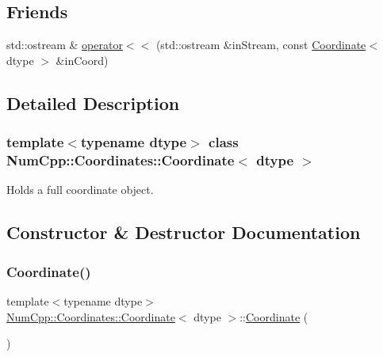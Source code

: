 \subsection*{Friends}
\begin{DoxyCompactItemize}
\item 
std\+::ostream \& \mbox{\hyperlink{class_num_cpp_1_1_coordinates_1_1_coordinate_aa5a56295ef46edb54bf7fdafb169c081}{operator$<$$<$}} (std\+::ostream \&in\+Stream, const \mbox{\hyperlink{class_num_cpp_1_1_coordinates_1_1_coordinate}{Coordinate}}$<$ dtype $>$ \&in\+Coord)
\end{DoxyCompactItemize}


\subsection{Detailed Description}
\subsubsection*{template$<$typename dtype$>$\newline
class Num\+Cpp\+::\+Coordinates\+::\+Coordinate$<$ dtype $>$}

Holds a full coordinate object. 

\subsection{Constructor \& Destructor Documentation}
\mbox{\label{class_num_cpp_1_1_coordinates_1_1_coordinate_acd7f14b8d7baab313c6a195dfce7bae1}} 
\subsubsection{\texorpdfstring{Coordinate()}{Coordinate()}\hspace{0.1cm}{\footnotesize\ttfamily [1/6]}}
{\footnotesize\ttfamily template$<$typename dtype$>$ \\
\mbox{\hyperlink{class_num_cpp_1_1_coordinates_1_1_coordinate}{Num\+Cpp\+::\+Coordinates\+::\+Coordinate}}$<$ dtype $>$\+::\mbox{\hyperlink{class_num_cpp_1_1_coordinates_1_1_coordinate}{Coordinate}} (\begin{DoxyParamCaption}{ }\end{DoxyParamCaption})\hspace{0.3cm}{\ttfamily [inline]}}

